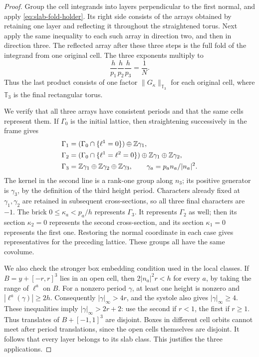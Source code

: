 \begin{proof}
Group the cell integrands into layers perpendicular to the first normal,
and apply \eqref{eq:slab-fold-holder}. Its right side consists of the
arrays obtained by retaining one layer and reflecting it throughout
the straightened torus. Next apply the same inequality to each such
array in direction two, and then in direction three. The reflected
array after these three steps is the full fold of the integrand from
one original cell. The three exponents multiply to
\[
 \frac h{p_1}\frac h{p_2}\frac h{p_3}
       =\frac1N.
\]
Thus the last product consists of one factor
$\|G_\kappa\|_{\mathbb T_3}$ for each original cell, where
$\mathbb T_3$ is the final rectangular torus.

We verify that all three arrays have consistent periods and that the
same cells represent them. If $\Gamma_0$ is the initial lattice, then
straightening successively in the frame gives
\begin{align*}
 \Gamma_1&=(\Gamma_0\cap\{\ell^1=0\})\oplus\mathbb Z\gamma_1,\\
 \Gamma_2&=(\Gamma_0\cap\{\ell^1=\ell^2=0\})
                                  \oplus\mathbb Z\gamma_1\oplus\mathbb Z\gamma_2,\\
 \Gamma_3&=\mathbb Z\gamma_1\oplus\mathbb Z\gamma_2\oplus\mathbb Z\gamma_3,
 \qquad \gamma_a=p_an_a/|n_a|^2.
\end{align*}
The kernel in the second line is a rank-one group along $n_3$; its
positive generator is $\gamma_3$, by the definition of the third
height period. Characters already fixed at $\gamma_1,\gamma_2$ are
retained in subsequent cross-sections, so all three final characters
are $-1$. The brick $0\le\kappa_a<p_a/h$ represents $\Gamma_3$.
It represents $\Gamma_2$ as well; then its section $\kappa_2=0$
represents the second cross-section, and its section $\kappa_1=0$
represents the first one. Restoring the normal coordinate in each
case gives representatives for the preceding lattice. These groups
all have the same covolume.

We also check the stronger box embedding condition used in the local
classes. If $B=y+[-r,r]^3$ lies in an open cell, then
$2|n_a|^2r<h$ for every $a$, by taking the range of $\ell^a$ on $B$.
For a nonzero period $\gamma$, at least one height is nonzero and
$|\ell^a(\gamma)|\ge2h$. Consequently
$|\gamma|_\infty>4r$, and the systole also gives
$|\gamma|_\infty\ge4$. These inequalities imply
$|\gamma|_\infty>2r+2$: use the second if $r<1$, the first if
$r\ge1$. Thus translates of $B+[-1,1]^3$ are disjoint. Boxes in
different cell orbits cannot meet after period translations, since
the open cells themselves are disjoint. It follows that every layer
belongs to its slab class. This justifies the three applications.


\end{proof}
